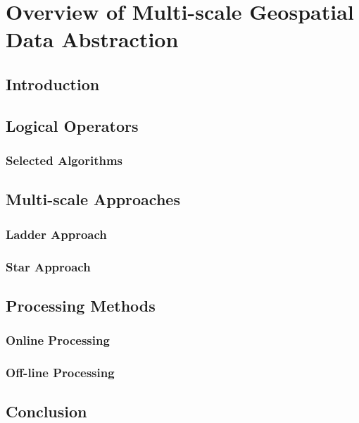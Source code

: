 \chapter{Overview of Multi-scale Geospatial Data Abstraction}

\section{Introduction}

\section{Logical Operators}
\subsection{Selected Algorithms}

\section{Multi-scale Approaches}
\subsection{Ladder Approach}
\subsection{Star Approach}

\section{Processing Methods}
\subsection{Online Processing}

\subsection{Off-line Processing}

\section{Conclusion}

